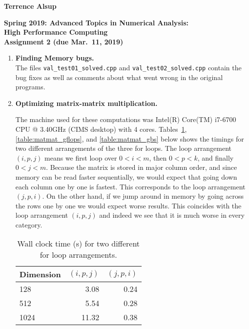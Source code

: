 \documentclass[12pt]{article}
\begin{document}
\vspace*{.5cm}
\begin{center}
\large \textbf{%
Terrence Alsup}

\vspace*{1
cm}

\large \textbf{
Spring 2019: Advanced Topics in Numerical Analysis: \\
High Performance Computing \\
Assignment 2 (due Mar.\ 11, 2019) }
\end{center}




%
\begin{enumerate}
 \item {\bf Finding Memory bugs.}  \\

The files {\tt val\_test01\_solved.cpp} and {\tt val\_test02\_solved.cpp} contain the bug fixes as well as comments about what went wrong in the original programs.

  \item {\bf Optimizing matrix-matrix multiplication.} 

The machine used for these computations was Intel(R) Core(TM) i7-6700 CPU @ 3.40GHz (CIMS desktop) with 4 cores.  Tables~\ref{table:matmat_timings}, \ref{table:matmat_gflops}, and \ref{table:matmat_gbs} below shows the timings for two different arrangements of the three for loops.  The loop arrangement $(i,p,j)$ means we first loop over $0 < i < m$, then $0 < p < k$, and finally $0 < j < m$.  Because the matrix is stored in major column order, and since memory can be read faster sequentially, we would expect that going down each column one by one is fastest.  This corresponds to the loop arrangement $(j,p,i)$.  On the other hand, if we jump around in memory by going across the rows one by one we would expect worse results.  This coincides with the loop arrangement $(i,p,j)$ and indeed we see that it is much worse in every category.

\begin{table}[H]
\centering
\begin{tabular}{| l | r | r |}
\hline
Dimension & $(i, p, j)$ & $(j,p,i)$\\
\hline
128 & 3.08 & 0.24 \\
\hline
512 & 5.54 & 0.28 \\
\hline
1024 & 11.32 & 0.38 \\
\hline
\end{tabular}
\caption{Wall clock time (s) for two different for loop arrangements.}
\label{table:matmat_timings}
\end{table}



\end{enumerate}
\end{document}
